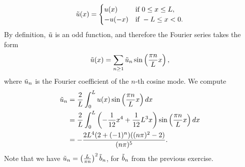 \documentclass[11pt]{article}
\begin{document}
\begin{solution}
    \begin{align*}
        \Tilde u(x) = \begin{cases}
            u(x) & \text{if } 0 \leq x \leq L,\\
            -u(-x) & \text{if } -L \leq x < 0.
        \end{cases}
    \end{align*}
    By definition, $\Tilde u$ is an odd function, and therefore the Fourier series takes the form 
    \begin{align*}
        \Tilde u(x) = \sum_{n \geq 1} \Tilde u_n \sin\left(\frac{\pi n}{L} x\right),
    \end{align*}
    where $\Tilde u_{n}$ is the Fourier coefficient of the $n$-th cosine mode. 
    We compute 
    \begin{align*}
        \Tilde u_n 
        &= 
        \frac{2}{L} \int_0^L u(x) \sin\left(\frac{\pi n}{L} x\right) dx
        \\&
        = 
        \frac{2}{L} \int_0^L \left(-\frac{1}{12} x^4 + \frac{1}{12} L^3 x\right) \sin\left(\frac{\pi n}{L} x\right) dx
        \\&
        = 
        -\frac{2 L^4 (2 + (-1)^n)((n \pi)^2 - 2)}{(n \pi)^5}
        .
    \end{align*}
    Note that we have $\Tilde u_n = \left(\frac{L}{\pi n}\right)^2 \Tilde{b}_n$, for $\Tilde b_n$ from the previous exercise.
\end{solution}
\end{document}
